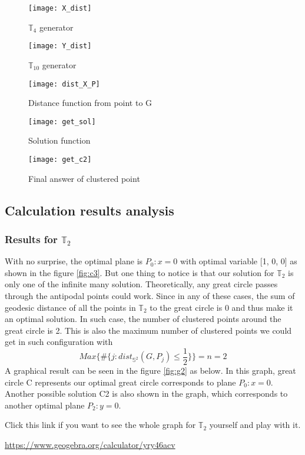 \documentclass[12pt]{article}
\numberwithin{equation}{section}
\let\bb\mathbb
\let\bb\mathbb
\begin{document}
	\begin{figure}
		\centering
		\texttt{[image: X\_dist]}
		\caption{$\bb{T}_4$ generator}
		\label{fig:t4}
	\end{figure}

	\begin{figure}
		\centering
		\texttt{[image: Y\_dist]}
		\caption{$\bb{T}_{10}$ generator}
		\label{fig:t10}
	\end{figure}

	\begin{figure}
		\centering
		\texttt{[image: dist\_X\_P]}
		\caption{Distance function from point to G}
		\label{fig:dist}
	\end{figure}
	
	\begin{figure}
		\centering
		\texttt{[image: get\_sol]}
		\caption{Solution function}
		\label{fig:sol}
	\end{figure}
	
	\begin{figure}
		\centering
		\texttt{[image: get\_c2]}
		\caption{Final answer of clustered point}
		\label{fig:c2}
	\end{figure}
	\newpage
	
	\subsection{Calculation results analysis}
		\subsubsection{Results for $\bb{T}_2$}
		With no surprise, the optimal plane is $P_0: x=0$ with optimal variable [1, 0, 0] as shown in the figure \ref{fig:c3}. But one thing to notice is that our solution for $\bb{T}_2$ is only one of the infinite many solution. Theoretically, any great circle passes through the antipodal points could work. Since in any of these cases, the sum of geodesic distance of all the points in $\bb{T}_2$ to the great circle is 0 and thus make it an optimal solution. In such case, the number of clustered points around the great circle is 2. This is also the maximum number of clustered points we could get in such configuration with 
		\[ Max \{\#  \{ j:dist_{{\bb{S}}^2} (G, P_j)\leq \dfrac{1}{2} \}\} = n = 2\]
		A graphical result can be seen in the figure \ref{fig:g2} as below.
		In this graph, great circle C represents our optimal great circle corresponds to plane $P_0 : x = 0$. Another possible solution C2 is also shown in the graph, which corresponds to another optimal plane $P_2: y = 0$. \par 
		Click this link if you want to see the whole graph for $\bb{T}_2$ yourself and play with it. \par 
		\url{https://www.geogebra.org/calculator/yry46acv}
		
\end{document}

